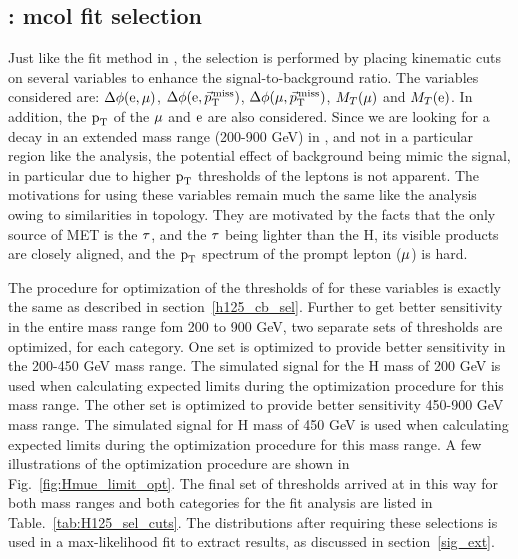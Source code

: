 \subsection{\Hmue: mcol fit selection}
\label{H125_cb_sel}
 Just like the \mcol fit method in \hmue, the selection is performed by placing kinematic cuts on several variables to enhance the signal-to-background ratio. The variables considered are: $\Delta\phi(\text{e}, \mu)$, $\Delta\phi(\text{e}, {\vec p}_{\mathrm{T}}^{\kern1pt\text{miss}})$, $\Delta\phi(\mu, {\vec p}_{\mathrm{T}}^{\kern1pt\text{miss}})$, $M_T(\mu)$ and $M_T(\text{e})$. In addition, the $\text{p}_\text{T}$ of the $\mu$ and $\text{e}$ are also considered. Since we are looking for a decay in an extended mass range (200-900 GeV) in \Hmue, and not in a particular region like the \hmue analysis, the potential effect of background being mimic the signal, in particular due to higher $\text{p}_\text{T}$ thresholds of the leptons is not apparent. The motivations for using these variables remain much the same like the \hmue analysis owing to similarities in topology. They are motivated by the facts that the only source of MET is the $\tau$, and the  $\tau$ being lighter than the H, its visible products are closely aligned, and the $\text{p}_\text{T}$ spectrum of the prompt lepton ($\mu$) is hard.

The procedure for optimization of the thresholds of for these variables is exactly the same as described in section~\ref{h125_cb_sel}. Further to get better sensitivity in the entire mass range fom 200 to 900 GeV, two separate sets of thresholds are optimized, for each category. One set is optimized to provide better sensitivity in the 200-450 GeV mass range. The simulated signal for the H mass of 200 GeV is used when calculating expected limits during the optimization procedure for this mass range. The other set is optimized to provide better sensitivity 450-900 GeV mass range. The simulated signal for H mass of 450 GeV is used when calculating expected limits during the optimization procedure for this mass range. A few illustrations of the optimization procedure are shown in Fig.~\ref{fig:Hmue_limit_opt}. The final set of thresholds arrived at in this way for both mass ranges and both categories for the \Hmue \mcol fit analysis are listed in Table.~\ref{tab:H125_sel_cuts}. The \mcol distributions after requiring these selections is used in a max-likelihood fit to extract results, as discussed in section~\ref{sig_ext}.


